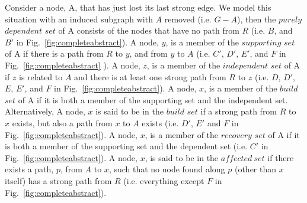 Consider a node, A, that has just lost its last strong edge. We model this situation
with an induced subgraph with $A$ removed (i.e. $G-A$), then the $purely$ $dependent$ $set$ of A
consists of the nodes that have no path from $R$
(i.e. $B$, and $B'$  in Fig.~\ref{fig:completeabstract}).
A node, $y$, is a member of the $supporting$ $set$ of A if
there is a path from $R$ to $y$, and from $y$ to $A$ (i.e.
$C'$, $D'$, $E'$, and $F$ in Fig.~\ref{fig:completeabstract} ).
A node, $z$, is a member of the $independent$ $set$ of A if $z$ is related to $A$ and
there is at least one strong path from $R$ to $z$
(i.e.
$D$, $D'$, $E$, $E'$, and $F$ in Fig.~\ref{fig:completeabstract}).
A node, $x$, is a member of the $build$ $set$ of A if it is both a member of the supporting set and
the independent set.
Alternatively, A node, $x$ is said to be in the $build$ $set$ if a strong path from $R$ to $x$ exists,
but also a path from $x$ to $A$ exists (i.e. $D'$, $E'$ and $F$ in Fig.~\ref{fig:completeabstract}).
A node, $x$, is a member of the $recovery$ $set$ of A if it is both a member of the supporting set
and the dependent set
(i.e. $C'$ in Fig.~\ref{fig:completeabstract}).
A node, $x$, is said to be in the $\mathit{affected\ set}$ if there exists a path, $p$, from $A$ to $x$, such that no
node found along $p$ (other than $x$ itself) has a strong path from $R$ (i.e.
everything except $F$ in Fig.~\ref{fig:completeabstract}).
